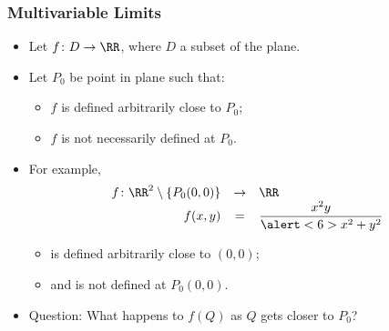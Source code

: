 \begin{frame}
\frametitle{Multivariable Limits}
\begin{itemize}
\item Let $f\colon D \to \RR$, where $D$ a subset of the plane. 
\item<2-> Let $P_0$ be point in plane such that:
\begin{itemize}
\item<2-> \alert<5>{$f$ is defined arbitrarily close to $P_0$};
\item<3-> \alert<6>{$f$ is not necessarily defined at $P_0$}.
\end{itemize}
\item<4-> For example,
\[ 
\begin{array}{rcl}
\displaystyle f \colon  \RR^2\setminus \{ P_0(0,0)\} &\to&\displaystyle  \RR \\
\displaystyle f(x,y)& =& \displaystyle \frac{x^2y}{\alert<6> {x^2+y^2}}
\end{array}
\]
\begin{itemize}
\item<4-> \alert<5>{is defined arbitrarily close to $(0,0)$};
\item<4-> \alert<6>{and is not defined at $P_0(0,0)$}.
\end{itemize}
\item<7-> Question: What happens to $f(Q)$ as $Q$ gets closer to $P_0$?
\end{itemize}
\end{frame}